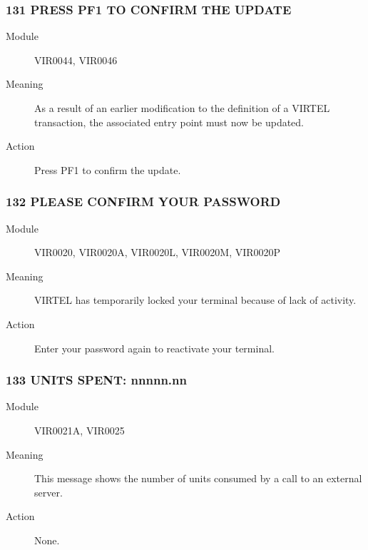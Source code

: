 \documentclass[letterpaper,10pt,english]{sphinxmanual}
\begin{document}
\subsubsection{131 PRESS PF1 TO CONFIRM THE UPDATE}
\label{\detokenize{messages:press-pf1-to-confirm-the-update}}\begin{description}
\item[{Module}] \leavevmode
VIR0044, VIR0046

\item[{Meaning}] \leavevmode
As a result of an earlier modification to the definition of a VIRTEL transaction, the associated entry point must now be updated.

\item[{Action}] \leavevmode
Press PF1 to confirm the update.

\end{description}


\subsubsection{132 PLEASE CONFIRM YOUR PASSWORD}
\label{\detokenize{messages:please-confirm-your-password}}\begin{description}
\item[{Module}] \leavevmode
VIR0020, VIR0020A, VIR0020L, VIR0020M, VIR0020P

\item[{Meaning}] \leavevmode
VIRTEL has temporarily locked your terminal because of lack of activity.

\item[{Action}] \leavevmode
Enter your password again to reactivate your terminal.

\end{description}


\subsubsection{133 UNITS SPENT: nnnnn.nn}
\label{\detokenize{messages:units-spent-nnnnn-nn}}\begin{description}
\item[{Module}] \leavevmode
VIR0021A, VIR0025

\item[{Meaning}] \leavevmode
This message shows the number of units consumed by a call to an external server.

\item[{Action}] \leavevmode
None.

\end{description}
\end{document}
